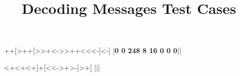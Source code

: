 \documentclass{../../codeproblem}
\begin{document}
\title{Decoding Messages Test Cases}

\begin{example}
++[>++[>>+<->>++<<<-]<-]
|\textbf{0 0 248 8 16 0 0 0}||\end{example}

\begin{example}
<+<+<+[+[<<->+>-]>+]
|\textbf{}||\end{example}
\end{document}
